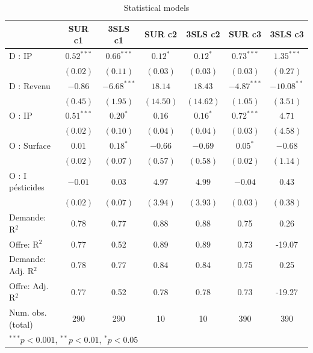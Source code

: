 \documentclass[11pt,]{article}
\begin{document}
\begin{table}[!htbp]
\begin{center}
\begin{tabular}{l c c c c c c }
\hline
 & SUR c1 & 3SLS c1 & SUR c2 & 3SLS c2 & SUR c3 & 3SLS c3 \\
\hline
D : IP              & $0.52^{***}$ & $0.66^{***}$  & $0.12^{*}$ & $0.12^{*}$ & $0.73^{***}$  & $1.35^{***}$  \\
                    & $(0.02)$     & $(0.11)$      & $(0.03)$   & $(0.03)$   & $(0.03)$      & $(0.27)$      \\
D : Revenu          & $-0.86$      & $-6.68^{***}$ & $18.14$    & $18.43$    & $-4.87^{***}$ & $-10.08^{**}$ \\
                    & $(0.45)$     & $(1.95)$      & $(14.50)$  & $(14.62)$  & $(1.05)$      & $(3.51)$      \\
O : IP              & $0.51^{***}$ & $0.20^{*}$    & $0.16$     & $0.16^{*}$ & $0.72^{***}$  & $4.71$        \\
                    & $(0.02)$     & $(0.10)$      & $(0.04)$   & $(0.04)$   & $(0.03)$      & $(4.58)$      \\
O : Surface         & $0.01$       & $0.18^{*}$    & $-0.66$    & $-0.69$    & $0.05^{*}$    & $-0.68$       \\
                    & $(0.02)$     & $(0.07)$      & $(0.57)$   & $(0.58)$   & $(0.02)$      & $(1.14)$      \\
O : I pésticides    & $-0.01$      & $0.03$        & $4.97$     & $4.99$     & $-0.04$       & $0.43$        \\
                    & $(0.02)$     & $(0.07)$      & $(3.94)$   & $(3.93)$   & $(0.03)$      & $(0.38)$      \\
\hline
Demande: R$^2$      & 0.78         & 0.77          & 0.88       & 0.88       & 0.75          & 0.26          \\
Offre: R$^2$        & 0.77         & 0.52          & 0.89       & 0.89       & 0.73          & -19.07        \\
Demande: Adj. R$^2$ & 0.78         & 0.77          & 0.84       & 0.84       & 0.75          & 0.25          \\
Offre: Adj. R$^2$   & 0.77         & 0.52          & 0.78       & 0.78       & 0.73          & -19.27        \\
Num. obs. (total)   & 290          & 290           & 10         & 10         & 390           & 390           \\
\hline
\multicolumn{7}{l}{\scriptsize{$^{***}p<0.001$, $^{**}p<0.01$, $^*p<0.05$}}
\end{tabular}
\caption{Statistical models}
\label{table : sur et 3sls clusters}
\end{center}
\end{table}
\end{document}
